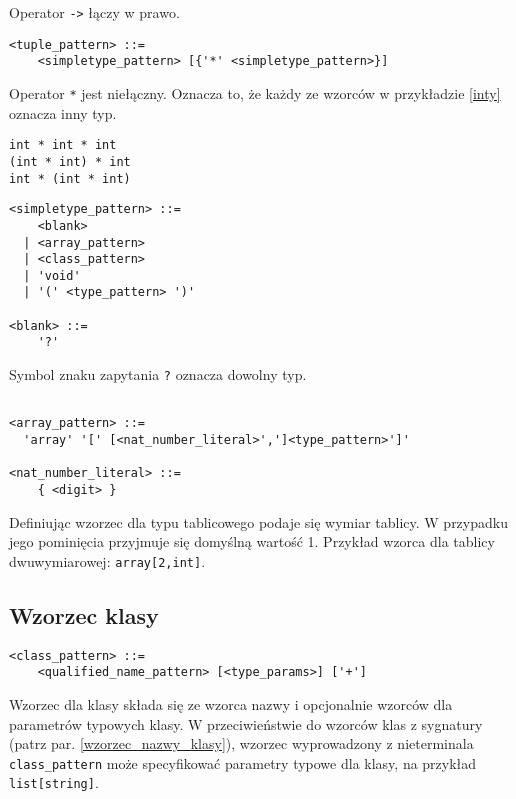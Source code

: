 \documentclass[a4paper,12pt]{mwbk}
\begin{document}
Operator \lstinline!->! łączy w prawo.

\begin{lstlisting}[style=grammar]
<tuple_pattern> ::=
    <simpletype_pattern> [{'*' <simpletype_pattern>}]
\end{lstlisting}

Operator \lstinline!*! jest niełączny. Oznacza to, że każdy ze wzorców w
przykładzie \ref{inty} oznacza inny typ.

\begin{lstlisting}[style=AspectJ,label=inty,caption=Operator * jest niełączny]
int * int * int
(int * int) * int
int * (int * int)
\end{lstlisting}


\begin{lstlisting}[style=grammar]
<simpletype_pattern> ::=
    <blank>
  | <array_pattern>
  | <class_pattern>
  | 'void'
  | '(' <type_pattern> ')'

<blank> ::=
    '?'
\end{lstlisting}

Symbol znaku zapytania \lstinline!?! oznacza dowolny typ.

\begin{lstlisting}[style=grammar]
    
<array_pattern> ::=
  'array' '[' [<nat_number_literal>',']<type_pattern>']'

<nat_number_literal> ::=
    { <digit> }

\end{lstlisting}

Definiując wzorzec dla typu tablicowego podaje się wymiar tablicy. W przypadku
jego pominięcia przyjmuje się domyślną wartość 1. Przykład wzorca dla tablicy
dwuwymiarowej: \lstinline!array[2,int]!.

\subsection{Wzorzec klasy}

\begin{lstlisting}[style=grammar]
<class_pattern> ::=
    <qualified_name_pattern> [<type_params>] ['+']
\end{lstlisting}

Wzorzec dla klasy składa się ze wzorca nazwy i opcjonalnie wzorców dla
parametrów typowych klasy. W przeciwieństwie do wzorców klas z sygnatury (patrz
par. \ref{wzorzec_nazwy_klasy}), wzorzec wyprowadzony z nieterminala
\lstinline!class_pattern! może specyfikować parametry typowe dla klasy, na
przykład \lstinline!list[string]!.
\end{document}
